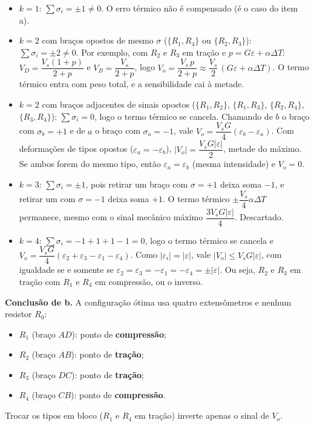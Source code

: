 \documentclass{article}%
\begin{document}
\begin{itemize}
\item $k=1$: $\sum\sigma_i=\pm1\neq0$. O erro térmico não é compensado (é o caso do item a).
\item $k=2$ com braços opostos de mesmo $\sigma$ ($\{R_1,R_4\}$ ou $\{R_2,R_3\}$): $\sum\sigma_i=\pm2\neq0$. Por exemplo, com $R_2$ e $R_3$ em tração e $p=G\varepsilon+\alpha\Delta T$: $V_D=\dfrac{V_s(1+p)}{2+p}$ e $V_B=\dfrac{V_s}{2+p}$, logo $V_o=\dfrac{V_s\,p}{2+p}\approx\dfrac{V_s}{2}\,(G\varepsilon+\alpha\Delta T)$. O termo térmico entra com peso total, e a sensibilidade cai à metade.
\item $k=2$ com braços adjacentes de sinais opostos ($\{R_1,R_2\}$, $\{R_1,R_3\}$, $\{R_2,R_4\}$, $\{R_3,R_4\}$): $\sum\sigma_i=0$, logo o termo térmico se cancela. Chamando de $b$ o braço com $\sigma_b=+1$ e de $a$ o braço com $\sigma_a=-1$, vale $V_o=\dfrac{V_sG}{4}(\varepsilon_b-\varepsilon_a)$. Com deformações de tipos opostos ($\varepsilon_a=-\varepsilon_b$), $|V_o|=\dfrac{V_sG|\varepsilon|}{2}$, metade do máximo. Se ambos forem do mesmo tipo, então $\varepsilon_a=\varepsilon_b$ (mesma intensidade) e $V_o=0$.
\item $k=3$: $\sum\sigma_i=\pm1$, pois retirar um braço com $\sigma=+1$ deixa soma $-1$, e retirar um com $\sigma=-1$ deixa soma $+1$. O termo térmico $\pm\dfrac{V_s}{4}\alpha\Delta T$ permanece, mesmo com o sinal mecânico máximo $\dfrac{3V_sG|\varepsilon|}{4}$. Descartado.
\item $k=4$: $\sum\sigma_i=-1+1+1-1=0$, logo o termo térmico se cancela e $V_o=\dfrac{V_sG}{4}(\varepsilon_2+\varepsilon_3-\varepsilon_1-\varepsilon_4)$. Como $|\varepsilon_i|=|\varepsilon|$, vale $|V_o|\le V_sG|\varepsilon|$, com igualdade se e somente se $\varepsilon_2=\varepsilon_3=-\varepsilon_1=-\varepsilon_4=\pm|\varepsilon|$. Ou seja, $R_2$ e $R_3$ em tração com $R_1$ e $R_4$ em compressão, ou o inverso.
\end{itemize}

\textbf{Conclusão de b.} A configuração ótima usa quatro extensômetros e nenhum resistor $R_0$:
\begin{itemize}
\item $R_1$ (braço $AD$): ponto de \textbf{compressão};
\item $R_2$ (braço $AB$): ponto de \textbf{tração};
\item $R_3$ (braço $DC$): ponto de \textbf{tração};
\item $R_4$ (braço $CB$): ponto de \textbf{compressão}.
\end{itemize}
Trocar os tipos em bloco ($R_1$ e $R_4$ em tração) inverte apenas o sinal de $V_o$.
\end{document}
